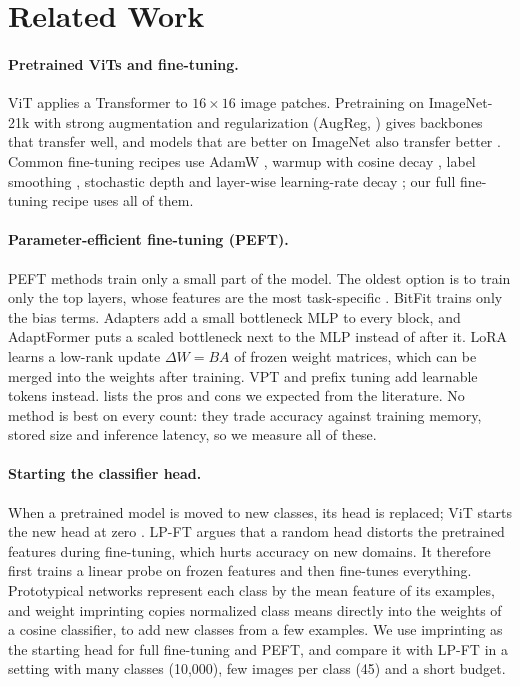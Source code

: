 \section{Related Work}
\label{sec:related}

\paragraph{Pretrained ViTs and fine-tuning.}
ViT \citep{dosovitskiy2021vit} applies a Transformer \citep{vaswani2017attention} to $16 \times 16$ image patches.
Pretraining on ImageNet-21k \citep{deng2009imagenet} with strong augmentation and regularization (AugReg, \citealp{steiner2022augreg}) gives backbones that transfer well, and models that are better on ImageNet also transfer better \citep{kornblith2019better}.
Common fine-tuning recipes use AdamW \citep{loshchilov2019adamw}, warmup with cosine decay \citep{loshchilov2017sgdr}, label smoothing \citep{szegedy2016rethinking}, stochastic depth \citep{huang2016stochastic} and layer-wise learning-rate decay \citep{bao2022beit}; our full fine-tuning recipe uses all of them.

\paragraph{Parameter-efficient fine-tuning (PEFT).}
PEFT methods train only a small part of the model.
The oldest option is to train only the top layers, whose features are the most task-specific \citep{yosinski2014transferable}.
BitFit \citep{benzaken2022bitfit} trains only the bias terms.
Adapters \citep{houlsby2019adapter} add a small bottleneck MLP to every block, and AdaptFormer \citep{chen2022adaptformer} puts a scaled bottleneck next to the MLP instead of after it.
LoRA \citep{hu2022lora} learns a low-rank update $\Delta W = BA$ of frozen weight matrices, which can be merged into the weights after training.
VPT \citep{jia2022vpt} and prefix tuning \citep{li2021prefix} add learnable tokens instead.
 lists the pros and cons we expected from the literature.
No method is best on every count: they trade accuracy against training memory, stored size and inference latency, so we measure all of these.

\paragraph{Starting the classifier head.}
When a pretrained model is moved to new classes, its head is replaced; ViT starts the new head at zero \citep{dosovitskiy2021vit}.
LP-FT \citep{kumar2022lpft} argues that a random head distorts the pretrained features during fine-tuning, which hurts accuracy on new domains.
It therefore first trains a linear probe on frozen features and then fine-tunes everything.
Prototypical networks \citep{snell2017prototypical} represent each class by the mean feature of its examples, and weight imprinting \citep{qi2018imprinted} copies normalized class means directly into the weights of a cosine classifier, to add new classes from a few examples.
We use imprinting as the starting head for full fine-tuning and PEFT, and compare it with LP-FT in a setting with many classes (10,000), few images per class (45) and a short budget.

